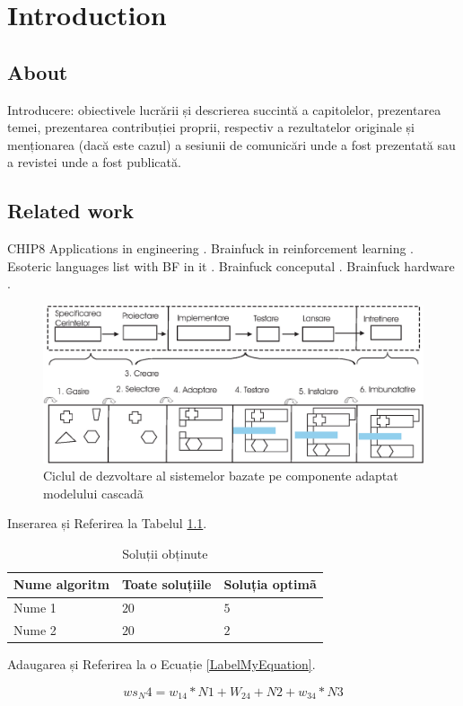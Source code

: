 \chapter{Introduction}
\label{chap:ch1}

\section{About}
\label{chap:ch1sec1}

\par Introducere: obiectivele lucrării și descrierea succintă a capitolelor, prezentarea temei, prezentarea contribuției proprii, respectiv a rezultatelor originale și menționarea (dacă este cazul) a sesiunii de comunicări unde a fost prezentată sau a revistei unde a fost publicată.

\section{Related work}
\label{chap:ch1sec2}

\par CHIP8 Applications in engineering \cite{Chip8Applications2019}.
Brainfuck in reinforcement learning \cite{BFReinforcementLearining2022}.
Esoteric languages list with BF in it \cite{BFEsolang2015}.
Brainfuck conceputal \cite{BFConceptual2017}.
Brainfuck hardware \cite{BFHardware2016}.

\begin{figure}[htbp]
	\centering
		\includegraphics[scale=0.65]{./figures/fig_3_1.eps}
	\caption{Ciclul de dezvoltare al sistemelor bazate pe componente adaptat modelului cascadã}
	\label{FigCBSD}
\end{figure}

Inserarea și Referirea la Tabelul \ref{TabelSolutii}. 

\begin{table}[htbp]
\begin{center}
\begin{tabular}
{|p{120pt}|p{120pt}|p{120pt}|}
\hline
 Nume algoritm  &  Toate soluțiile &  Soluția optimã\\
\hline 
\hline Nume 1 & $20$ & $5$  \\
\hline Nume 2 & $20$ & $2$  \\
\hline
\end{tabular}
\end{center}
\caption{Soluții obținute }
\label{TabelSolutii}
\end{table}


Adaugarea și Referirea la o Ecuație \ref{LabelMyEquation}.


 \begin{equation}
     ws_N4 = w_{14}*N1 + W_{24}+N2 + w_{34}*N3
\label{LabelMyEquation}
 \end{equation}
